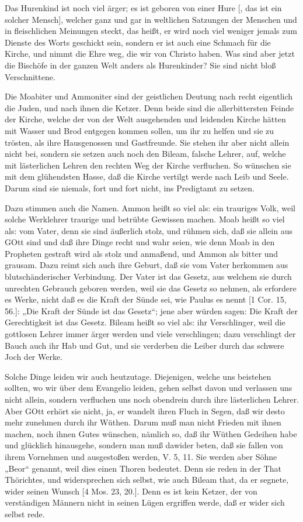 Das Hurenkind ist noch viel ärger; es ist geboren von einer Hure [, das ist ein solcher Mensch], welcher ganz und gar in weltlichen Satzungen der Menschen und in fleischlichen Meinungen steckt, das heißt, er wird noch viel weniger jemals zum Dienste des Worts geschickt sein, sondern er ist auch eine Schmach für die Kirche, und nimmt die Ehre weg, die wir von Christo haben. Was sind aber jetzt die Bischöfe in der ganzen Welt anders als Hurenkinder? Sie sind nicht bloß Verschnittene.

Die Moabiter und Ammoniter sind der geistlichen Deutung nach recht eigentlich die Juden, und nach ihnen die Ketzer. Denn beide sind die allerbittersten Feinde der Kirche, welche der von der Welt ausgehenden und leidenden Kirche hätten mit Wasser und Brod entgegen kommen sollen, um ihr zu helfen und sie zu trösten, als ihre Hausgenossen und Gastfreunde. Sie stehen ihr aber nicht allein nicht bei, sondern sie setzen auch noch den Bileam, falsche Lehrer, auf, welche mit lästerlichen Lehren den rechten Weg der Kirche verfluchen. So wünschen sie mit dem glühendsten Hasse, daß die Kirche vertilgt werde nach Leib und Seele. Darum sind sie niemals, fort und fort nicht, ins Predigtamt zu setzen.

Dazu stimmen auch die Namen. Ammon heißt so viel als: ein trauriges Volk, weil solche Werklehrer traurige und betrübte Gewissen machen. Moab heißt so viel als: vom Vater, denn sie sind äußerlich stolz, und rühmen sich, daß sie allein aus GOtt sind und daß ihre Dinge recht und wahr seien, wie denn Moab in den Propheten gestraft wird als stolz und anmaßend, und Ammon als bitter und grausam. Dazu reimt sich auch ihre Geburt, daß sie vom Vater herkommen aus blutschänderischer Verbindung. Der Vater ist das Gesetz, aus welchem sie durch unrechten Gebrauch geboren werden, weil sie das Gesetz so nehmen, als erfordere es Werke, nicht daß es die Kraft der Sünde sei, wie Paulus es nennt [1 Cor. 15, 56.]: „Die Kraft der Sünde ist das Gesetz“; jene aber würden sagen: Die Kraft der Gerechtigkeit ist das Gesetz. Bileam heißt so viel als: ihr Verschlinger, weil die gottlosen Lehrer immer ärger werden und viele verschlingen; dazu verschlingt der Bauch auch ihr Hab und Gut, und sie verderben die Leiber durch das schwere Joch der Werke.

Solche Dinge leiden wir auch heutzutage. Diejenigen, welche uns beistehen sollten, wo wir über dem Evangelio leiden, gehen selbst davon und verlassen uns nicht allein, sondern verfluchen uns noch obendrein durch ihre lästerlichen Lehrer. Aber GOtt erhört sie nicht, ja, er wandelt ihren Fluch in Segen, daß wir desto mehr zunehmen durch ihr Wüthen. Darum muß man nicht Frieden mit ihnen machen, noch ihnen Gutes wünschen, nämlich so, daß ihr Wüthen Gedeihen habe und glücklich hinausgehe, sondern man muß dawider beten, daß sie fallen von ihrem Vornehmen und ausgestoßen werden, V. 5, 11. Sie werden aber Söhne „Beor“ genannt, weil dies einen Thoren bedeutet. Denn sie reden in der That Thörichtes, und widersprechen sich selbst, wie auch Bileam that, da er segnete, wider seinen Wunsch [4 Mos. 23, 20.]. Denn es ist kein Ketzer, der von verständigen Männern nicht in seinen Lügen ergriffen werde, daß er wider sich selbst rede.

